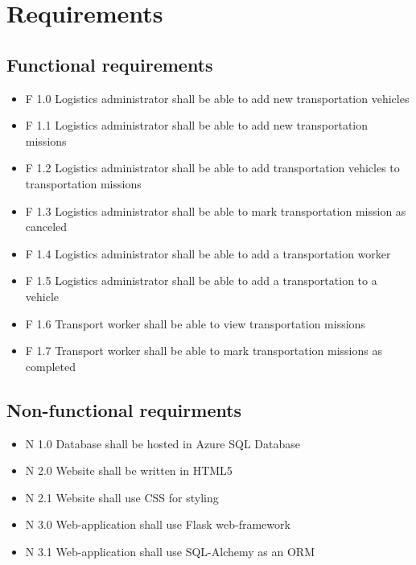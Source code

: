 \documentclass[a4paper, 12pt]{article}
\begin{document}
\section{Requirements}
\subsection{Functional requirements}
\begin{itemize}
  \item F 1.0 Logistics administrator shall be able to add new transportation vehicles
  \item F 1.1 Logistics administrator shall be able to add new transportation missions
  \item F 1.2 Logistics administrator shall be able to add transportation vehicles to transportation missions
  \item F 1.3 Logistics administrator shall be able to mark transportation mission as canceled
  \item F 1.4 Logistics administrator shall be able to add a transportation worker
  \item F 1.5 Logistics administrator shall be able to add a transportation to a vehicle
  \item F 1.6 Transport worker shall be able to view transportation missions
  \item F 1.7 Transport worker shall be able to mark transportation missions as completed
\end{itemize}
\subsection{Non-functional requirments}
\begin{itemize}
  \item N 1.0 Database shall be hosted in Azure SQL Database
  \item N 2.0 Website shall be written in HTML5
  \item N 2.1 Website shall use CSS for styling
  \item N 3.0 Web-application shall use Flask web-framework
  \item N 3.1 Web-application shall use SQL-Alchemy as an ORM
\end{itemize}
\end{document}
